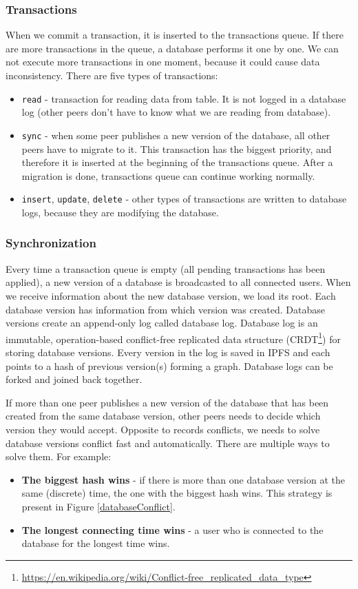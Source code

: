 \subsubsection{Transactions}
When we commit a transaction, it is inserted to the transactions queue. If there are more transactions in the queue, a database performs it one by one. We can not execute more transactions in one moment, because it could cause data inconsistency. There are five types of transactions:
\begin{itemize}
    \item \texttt{read} - transaction for reading data from table. It is not logged in a database log (other peers don't have to know what we are reading from database).
    \item \texttt{sync} - when some peer publishes a new version of the database, all other peers have to migrate to it. This transaction has the biggest priority, and therefore it is inserted at the beginning of the transactions queue. After a migration is done, transactions queue can continue working normally.
    \item \texttt{insert}, \texttt{update}, \texttt{delete} - other types of transactions are written to database logs, because they are modifying the database.
\end{itemize}

\subsubsection{Synchronization} 
Every time a transaction queue is empty (all pending transactions has been applied), a new version of a database is broadcasted to all connected users. When we receive information about the new database version, we load its root. Each database version has information from which version was created. Database versions create an append-only log called database log. Database log is an immutable, operation-based conflict-free replicated data structure (CRDT\footnote{\url{https://en.wikipedia.org/wiki/Conflict-free_replicated_data_type}}) for storing database versions. Every version in the log is saved in IPFS and each points to a hash of previous version(s) forming a graph. Database logs can be forked and joined back together.\cite{crdtLog}

If more than one peer publishes a new version of the database that has been created from the same database version, other peers needs to decide which version they would accept. Opposite to records conflicts, we needs to solve database versions conflict fast and automatically. There are multiple ways to solve them. For example: 
\begin{itemize}
    \item \textbf{The biggest hash wins} - if there is more than one database version at the same (discrete) time, the one with the biggest hash wins. This strategy is present in Figure \ref{databaseConflict}. 
    \item \textbf{The longest connecting time wins} - a user who is connected to the database for the longest time wins.
\end{itemize}

